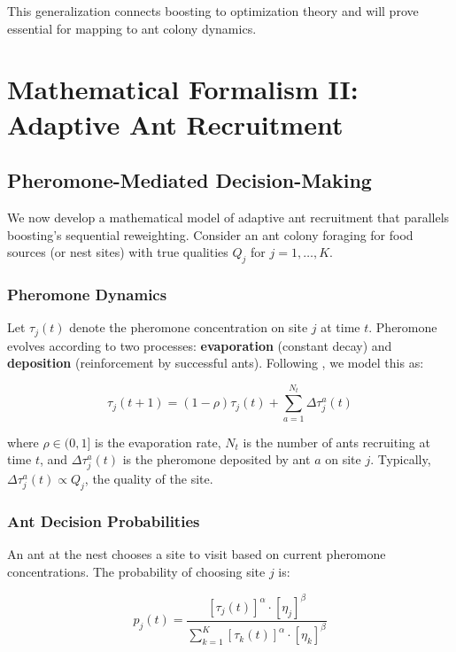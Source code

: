 \documentclass[12pt,letterpaper]{article}
\begin{document}
This generalization connects boosting to optimization theory and will prove essential for mapping to ant colony dynamics.

\section{Mathematical Formalism II: Adaptive Ant Recruitment}

\subsection{Pheromone-Mediated Decision-Making}

We now develop a mathematical model of adaptive ant recruitment that parallels boosting's sequential reweighting. Consider an ant colony foraging for food sources (or nest sites) with true qualities $Q_j$ for $j=1,\dots,K$.

\subsubsection{Pheromone Dynamics}

Let $\tau_j(t)$ denote the pheromone concentration on site $j$ at time $t$. Pheromone evolves according to two processes: \textbf{evaporation} (constant decay) and \textbf{deposition} (reinforcement by successful ants). Following \citet{dorigo1996ant}, we model this as:

\begin{equation}
\tau_j(t+1) = (1-\rho)\tau_j(t) + \sum_{a=1}^{N_t} \Delta \tau_j^a(t)
\label{eq:pheromone_update}
\end{equation}

where $\rho \in (0,1]$ is the evaporation rate, $N_t$ is the number of ants recruiting at time $t$, and $\Delta \tau_j^a(t)$ is the pheromone deposited by ant $a$ on site $j$. Typically, $\Delta \tau_j^a(t) \propto Q_j$, the quality of the site.

\subsubsection{Ant Decision Probabilities}

An ant at the nest chooses a site to visit based on current pheromone concentrations. The probability of choosing site $j$ is:

\begin{equation}
p_j(t) = \frac{[\tau_j(t)]^\alpha \cdot [\eta_j]^\beta}{\sum_{k=1}^K [\tau_k(t)]^\alpha \cdot [\eta_k]^\beta}
\label{eq:ant_choice}
\end{equation}
\end{document}
